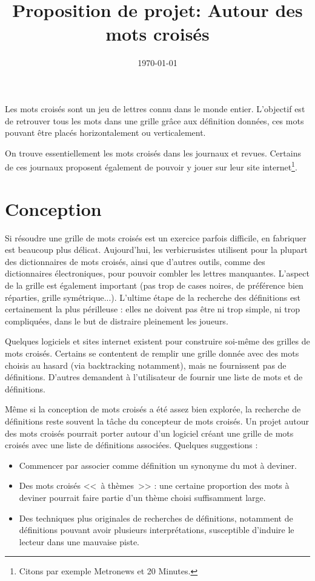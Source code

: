 \documentclass{article}
\title{Proposition de projet: Autour des mots croisés}
\author{}
\date{\today}
\begin{document}
\maketitle

Les mots croisés sont un jeu de lettres connu dans le monde entier. L'objectif est de retrouver tous les mots dans une grille grâce aux définition données, ces mots pouvant être placés horizontalement ou verticalement.

On trouve essentiellement les mots croisés dans les journaux et revues. Certains de ces journaux proposent également de pouvoir y jouer sur leur site internet\footnote{Citons par exemple Metronews et 20 Minutes.}.

\section{Conception}

Si résoudre une grille de mots croisés est un exercice parfois difficile, en fabriquer est beaucoup plus délicat. Aujourd'hui, les verbicrusistes utilisent pour la plupart des dictionnaires de mots croisés, ainsi que d'autres outils, comme des dictionnaires électroniques, pour pouvoir combler les lettres manquantes. L'aspect de la grille est également important (pas trop de cases noires, de préférence bien réparties, grille symétrique...). L'ultime étape de la recherche des définitions est certainement la plus périlleuse : elles ne doivent pas être ni trop simple, ni trop compliquées, dans le but de distraire pleinement les joueurs.

Quelques logiciels et sites internet existent pour construire soi-même des grilles de mots croisés. Certains se contentent de remplir une grille donnée avec des mots choisis au hasard (via backtracking notamment), mais ne fournissent pas de définitions. D'autres demandent à l'utilisateur de fournir une liste de mots et de définitions.

Même si la conception de mots croisés a été assez bien explorée, la recherche de définitions reste souvent la tâche du concepteur de mots croisés. Un projet autour des mots croisés pourrait porter autour d'un logiciel créant une grille de mots croisés avec une liste de définitions associées. Quelques suggestions :

\begin{itemize}
	\item Commencer par associer comme définition un synonyme du mot à deviner.
	\item Des mots croisés <<~à thèmes~>> : une certaine proportion des mots à deviner pourrait faire partie d'un thème choisi suffisamment large.
	\item Des techniques plus originales de recherches de définitions, notamment de définitions pouvant avoir plusieurs interprétations, susceptible d'induire le lecteur dans une mauvaise piste. %
\end{itemize}

\nocite{*}



\end{document}
